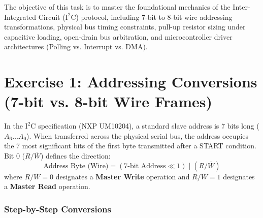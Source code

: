 \documentclass[11pt,a4paper]{article}
\begin{document}

\begin{objectivebox}
The objective of this task is to master the foundational mechanics of the Inter-Integrated Circuit ($\text{I}^2\text{C}$) protocol, including 7-bit to 8-bit wire addressing transformations, physical bus timing constraints, pull-up resistor sizing under capacitive loading, open-drain bus arbitration, and microcontroller driver architectures (Polling vs. Interrupt vs. DMA).
\end{objectivebox}

\section*{Exercise 1: Addressing Conversions (7-bit vs. 8-bit Wire Frames)}
\begin{theorybox}
In the $\text{I}^2\text{C}$ specification (NXP UM10204), a standard slave address is 7 bits long ($A_6 \dots A_0$). When transferred across the physical serial bus, the address occupies the 7 most significant bits of the first byte transmitted after a START condition. Bit 0 ($R/\overline{W}$) defines the direction:
\begin{equation}
\text{Address Byte (Wire)} = (\text{7-bit Address} \ll 1) \;|\; (R/\overline{W})
\end{equation}
where $R/\overline{W} = 0$ designates a \textbf{Master Write} operation and $R/\overline{W} = 1$ designates a \textbf{Master Read} operation.
\end{theorybox}

\subsubsection*{Step-by-Step Conversions}
\end{document}

